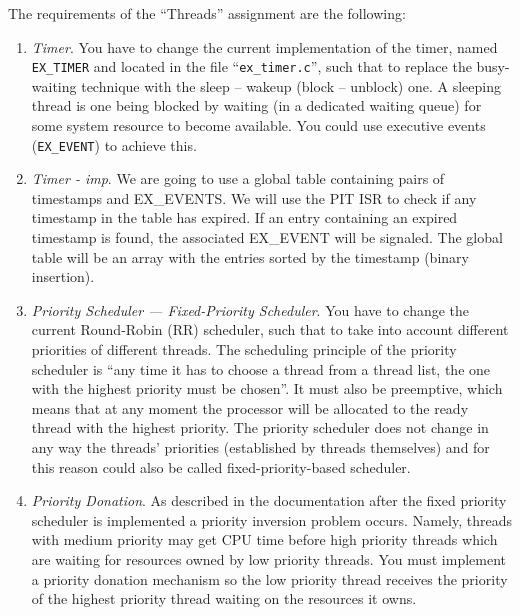The requirements of the ``Threads'' assignment are the following:
\begin{enumerate}
    \item \textit{Timer}. You have to change the current implementation of the timer, named \texttt{EX\_TIMER} and located in the file ``\texttt{ex\_timer.c}'', such that to replace the busy-waiting technique with the sleep -- wakeup (block -- unblock) one. A sleeping thread is one being blocked by waiting (in a dedicated waiting queue) for some system resource to become available. You could use executive events (\texttt{EX\_EVENT}) to achieve this.

    \item \textit{Timer - imp}. We are going to use a global table containing pairs of timestamps and EX_EVENTS. We will use the PIT ISR to check if any timestamp
    in the table has expired. If an entry containing an expired timestamp is found, the associated EX_EVENT will be signaled.
    The global table will be an array with the entries sorted by the timestamp (binary insertion).
    
    \item \textit{Priority Scheduler --- Fixed-Priority Scheduler}. You have to change the current Round-Robin (RR) scheduler, such that to take into account different priorities of different threads. The scheduling principle of the priority scheduler is ``any time it has to choose a thread from a thread list, the one with the highest priority must be chosen''. It must also be preemptive, which means that at any moment the processor will be allocated to the ready thread with the highest priority. The priority scheduler does not change in any way the threads' priorities (established by threads themselves) and for this reason could also be called fixed-priority-based scheduler. 

    \item \textit{Priority Donation}. As described in the \OSName{} documentation after the fixed priority scheduler is implemented a priority inversion problem occurs. Namely, threads with medium priority may get CPU time before high priority threads which are waiting for resources owned by low priority threads. You must implement a priority donation mechanism so the low priority thread receives the priority of the highest priority thread waiting on the resources it owns.
    
\end{enumerate}


